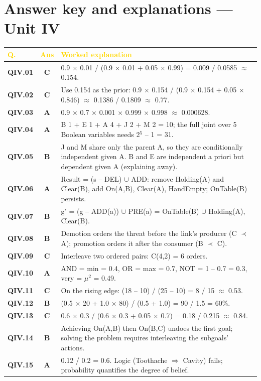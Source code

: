 \documentclass[11pt]{article}
\begin{document}
\section*{Answer key and explanations --- Unit IV}
\begin{longtable}{>{\leavevmode\bfseries\color{navy}}p{1.3cm} c p{13.2cm}}
\rowcolor{navy}\textcolor{gold}{\textbf{Q.}}&\textcolor{gold}{\textbf{Ans}}&\textcolor{gold}{\textbf{Worked explanation}}\\\endhead
QIV.01&\textbf{\color{leaf}C}&0.9 $\times$ 0.01 / (0.9 $\times$ 0.01 + 0.05 $\times$ 0.99) = 0.009 / 0.0585 $\approx$ 0.154.\\
\rowcolor{ivory}QIV.02&\textbf{\color{leaf}C}&Use 0.154 as the prior: 0.9 $\times$ 0.154 / (0.9 $\times$ 0.154 + 0.05 $\times$ 0.846) $\approx$ 0.1386 / 0.1809 $\approx$ 0.77.\\
QIV.03&\textbf{\color{leaf}A}&0.9 $\times$ 0.7 $\times$ 0.001 $\times$ 0.999 $\times$ 0.998 $\approx$ 0.000628.\\
\rowcolor{ivory}QIV.04&\textbf{\color{leaf}A}&B 1 + E 1 + A 4 + J 2 + M 2 = 10; the full joint over 5 Boolean variables needs 2$^5$ -- 1 = 31.\\
QIV.05&\textbf{\color{leaf}B}&J and M share only the parent A, so they are conditionally independent given A. B and E are independent a priori but dependent given A (explaining away).\\
\rowcolor{ivory}QIV.06&\textbf{\color{leaf}A}&Result = (s -- DEL) $\cup$ ADD: remove Holding(A) and Clear(B), add On(A,B), Clear(A), HandEmpty; OnTable(B) persists.\\
QIV.07&\textbf{\color{leaf}B}&g$'$ = (g -- ADD(a)) $\cup$ PRE(a) = {OnTable(B)} $\cup$ {Holding(A), Clear(B)}.\\
\rowcolor{ivory}QIV.08&\textbf{\color{leaf}B}&Demotion orders the threat before the link's producer (C $\prec$ A); promotion orders it after the consumer (B $\prec$ C).\\
QIV.09&\textbf{\color{leaf}C}&Interleave two ordered pairs: C(4,2) = 6 orders.\\
\rowcolor{ivory}QIV.10&\textbf{\color{leaf}A}&AND = min = 0.4, OR = max = 0.7, NOT = 1 -- 0.7 = 0.3, very = $\mu$$^2$ = 0.49.\\
QIV.11&\textbf{\color{leaf}C}&On the rising edge: (18 -- 10) / (25 -- 10) = 8 / 15 $\approx$ 0.53.\\
\rowcolor{ivory}QIV.12&\textbf{\color{leaf}B}&(0.5 $\times$ 20 + 1.0 $\times$ 80) / (0.5 + 1.0) = 90 / 1.5 = 60\%.\\
QIV.13&\textbf{\color{leaf}C}&0.6 $\times$ 0.3 / (0.6 $\times$ 0.3 + 0.05 $\times$ 0.7) = 0.18 / 0.215 $\approx$ 0.84.\\
\rowcolor{ivory}QIV.14&\textbf{\color{leaf}B}&Achieving On(A,B) then On(B,C) undoes the first goal; solving the problem requires interleaving the subgoals' actions.\\
QIV.15&\textbf{\color{leaf}A}&0.12 / 0.2 = 0.6. Logic (Toothache $\Rightarrow$ Cavity) fails; probability quantifies the degree of belief.\\
\end{longtable}
\end{document}

